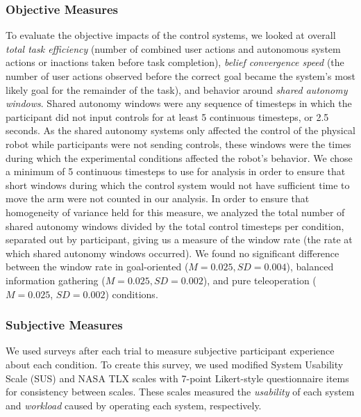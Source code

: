 \documentclass[conference]{IEEEtran}
\begin{document}
\subsubsection{Objective Measures}
To evaluate the objective impacts of the control systems, we looked at overall \textit{total task efficiency} (number of combined user actions and autonomous system actions or inactions taken before task completion), \textit{belief convergence speed} (the number of user actions observed before the correct goal became the system's most likely goal for the remainder of the task), and behavior around \textit{shared autonomy windows}. Shared autonomy windows were any sequence of timesteps in which the participant did not input controls for at least 5 continuous timesteps, or 2.5 seconds. As the shared autonomy systems only affected the control of the physical robot while participants were not sending controls, these windows were the times during which the experimental conditions affected the robot's behavior. We chose a minimum of 5 continuous timesteps to use for analysis in order to ensure that short windows during which the control system would not have sufficient time to move the arm were not counted in our analysis. In order to ensure that homogeneity of variance held for this measure, we analyzed the total number of shared autonomy windows divided by the total control timesteps per condition, separated out by participant, giving us a measure of the window rate (the rate at which shared autonomy windows occurred). We found no significant difference between the window rate in goal-oriented ($M = 0.025, SD = 0.004$), balanced information gathering ($M = 0.025, SD = 0.002$), and pure teleoperation ($M = 0.025$, $SD = 0.002$) conditions.

\subsubsection{Subjective Measures}

We used surveys after each trial to measure subjective participant experience about each condition. To create this survey, we used modified System Usability Scale (SUS) and NASA TLX scales with 7-point Likert-style questionnaire items for consistency between scales. These scales measured the \textit{usability} of each system and \textit{workload} caused by operating each system, respectively.

%
%
\end{document}
